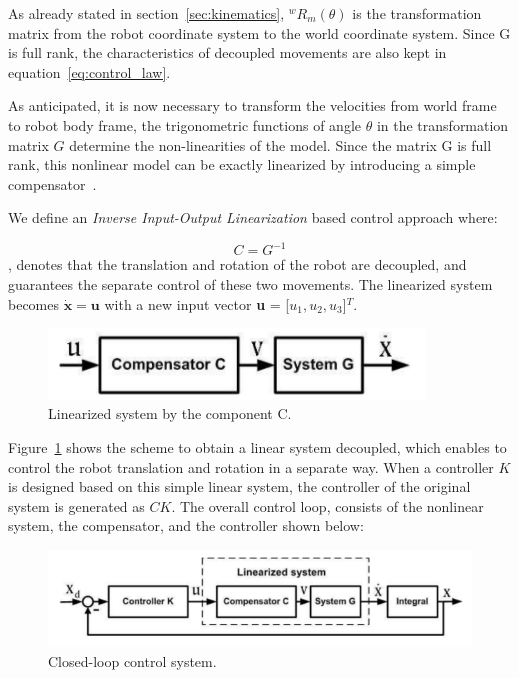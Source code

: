 As already stated in section~\ref{sec:kinematics}, $^wR_m(\theta)$ is the transformation matrix from the robot coordinate system to the world coordinate system. Since G is full rank, the characteristics of decoupled movements are also kept in equation~\ref{eq:control_law}.

As anticipated, it is now necessary to transform the velocities from world frame to robot body frame, the trigonometric functions of angle $\theta$ in the transformation matrix $G$ determine the non-linearities of the model. Since the matrix G is full rank, this nonlinear model can be exactly linearized by introducing a simple compensator~\citep{li_motion_2009}.

We define an \textit{Inverse Input-Output Linearization} based control approach where:

\begin{equation}
    C = G^{-1}
\end{equation} 
, denotes that the translation and rotation of the robot are decoupled, and guarantees the separate control of these two movements. The linearized system becomes $\mathbf{\dot{x}} = \mathbf{u}$ with a new input vector \textbf{u} = [$u_1,u_2,u_3$]$^T$.

\begin{figure}[H]
	\centering
	\includegraphics[width=10cm]{images/03-foundation/comp1}
	\caption{Linearized system by the component C.} 
	\label{comp1}
\end{figure}

Figure~\ref{comp1} shows the scheme to obtain a linear system decoupled, which enables to control the robot translation and rotation in a separate way. When a controller $K$ is designed based on this simple linear system, the controller of the original system is generated as $CK$. The overall control loop, consists of the nonlinear system, the compensator, and the controller shown below:

\begin{figure}[H]
	\centering
	\includegraphics[width=12cm]{images/03-foundation/comp2}
	\caption{Closed-loop control system.} 
	\label{comp2}
\end{figure}

